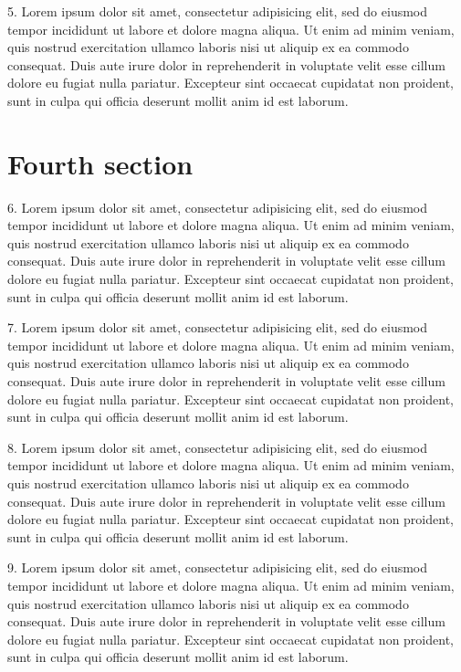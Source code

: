 \documentclass[11pt]{article}
\begin{document}
5. Lorem ipsum dolor sit amet, consectetur adipisicing elit, sed do eiusmod tempor incididunt ut labore et dolore magna aliqua. Ut enim ad minim veniam, quis nostrud exercitation ullamco laboris nisi ut aliquip ex ea commodo consequat. Duis aute irure dolor in reprehenderit in voluptate velit esse cillum dolore eu fugiat nulla pariatur. Excepteur sint occaecat cupidatat non proident, sunt in culpa qui officia deserunt mollit anim id est laborum.

\section{Fourth section}

6. Lorem ipsum dolor sit amet, consectetur adipisicing elit, sed do eiusmod tempor incididunt ut labore et dolore magna aliqua. Ut enim ad minim veniam, quis nostrud exercitation ullamco laboris nisi ut aliquip ex ea commodo consequat. Duis aute irure dolor in reprehenderit in voluptate velit esse cillum dolore eu fugiat nulla pariatur. Excepteur sint occaecat cupidatat non proident, sunt in culpa qui officia deserunt mollit anim id est laborum.

7. Lorem ipsum dolor sit amet, consectetur adipisicing elit, sed do eiusmod tempor incididunt ut labore et dolore magna aliqua. Ut enim ad minim veniam, quis nostrud exercitation ullamco laboris nisi ut aliquip ex ea commodo consequat. Duis aute irure dolor in reprehenderit in voluptate velit esse cillum dolore eu fugiat nulla pariatur. Excepteur sint occaecat cupidatat non proident, sunt in culpa qui officia deserunt mollit anim id est laborum.

8. Lorem ipsum dolor sit amet, consectetur adipisicing elit, sed do eiusmod tempor incididunt ut labore et dolore magna aliqua. Ut enim ad minim veniam, quis nostrud exercitation ullamco laboris nisi ut aliquip ex ea commodo consequat. Duis aute irure dolor in reprehenderit in voluptate velit esse cillum dolore eu fugiat nulla pariatur. Excepteur sint occaecat cupidatat non proident, sunt in culpa qui officia deserunt mollit anim id est laborum.

9. Lorem ipsum dolor sit amet, consectetur adipisicing elit, sed do eiusmod tempor incididunt ut labore et dolore magna aliqua. Ut enim ad minim veniam, quis nostrud exercitation ullamco laboris nisi ut aliquip ex ea commodo consequat. Duis aute irure dolor in reprehenderit in voluptate velit esse cillum dolore eu fugiat nulla pariatur. Excepteur sint occaecat cupidatat non proident, sunt in culpa qui officia deserunt mollit anim id est laborum.
\end{document}
